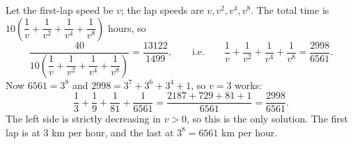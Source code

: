 Let the first-lap speed be $v$; the lap speeds are $v,v^2,v^4,v^8$. The total time is $10\left(\dfrac1v+\dfrac1{v^2}+\dfrac1{v^4}+\dfrac1{v^8}\right)$ hours, so
\[\dfrac{40}{10\left(\dfrac1v+\dfrac1{v^2}+\dfrac1{v^4}+\dfrac1{v^8}\right)}=\dfrac{13122}{1499},\qquad\text{i.e.}\qquad\dfrac1v+\dfrac1{v^2}+\dfrac1{v^4}+\dfrac1{v^8}=\dfrac{2998}{6561}.\]
Now $6561=3^8$ and $2998=3^7+3^6+3^4+1$, so $v=3$ works:
\[\dfrac13+\dfrac19+\dfrac1{81}+\dfrac1{6561}=\dfrac{2187+729+81+1}{6561}=\dfrac{2998}{6561}.\]
The left side is strictly decreasing in $v>0$, so this is the only solution. The first lap is at $\boxed{3}$ km per hour, and the last at $3^8=\boxed{6561}$ km per hour.
